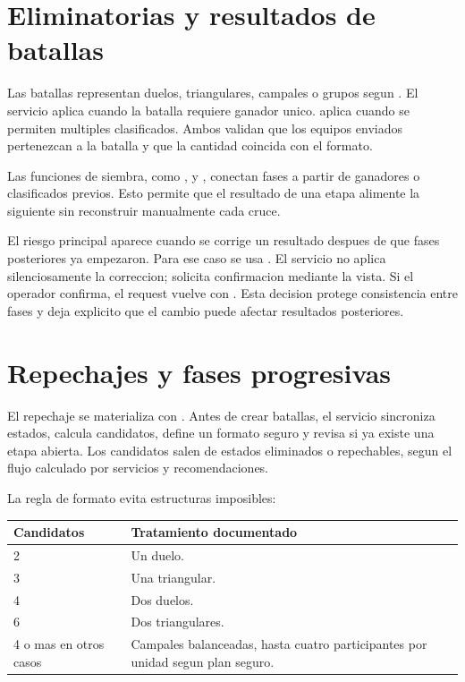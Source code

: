 \section{Eliminatorias y resultados de batallas}
\label{sec:servicios-eliminatorias}

Las batallas representan duelos, triangulares, campales o grupos segun . El servicio  aplica cuando la batalla requiere ganador unico.  aplica cuando se permiten multiples clasificados. Ambos validan que los equipos enviados pertenezcan a la batalla y que la cantidad coincida con el formato.

Las funciones de siembra, como ,  y , conectan fases a partir de ganadores o clasificados previos. Esto permite que el resultado de una etapa alimente la siguiente sin reconstruir manualmente cada cruce.

El riesgo principal aparece cuando se corrige un resultado despues de que fases posteriores ya empezaron. Para ese caso se usa . El servicio no aplica silenciosamente la correccion; solicita confirmacion mediante la vista. Si el operador confirma, el request vuelve con . Esta decision protege consistencia entre fases y deja explicito que el cambio puede afectar resultados posteriores.

\section{Repechajes y fases progresivas}
\label{sec:servicios-repechajes}

El repechaje se materializa con . Antes de crear batallas, el servicio sincroniza estados, calcula candidatos, define un formato seguro y revisa si ya existe una etapa abierta. Los candidatos salen de estados eliminados o repechables, segun el flujo calculado por servicios y recomendaciones.

La regla de formato evita estructuras imposibles:

\begin{longtable}{p{3.2cm}p{9.5cm}}
\toprule
Candidatos & Tratamiento documentado \\
\midrule
2 & Un duelo. \\
3 & Una triangular. \\
4 & Dos duelos. \\
6 & Dos triangulares. \\
4 o mas en otros casos & Campales balanceadas, hasta cuatro participantes por unidad segun plan seguro. \\
\bottomrule
\end{longtable}

